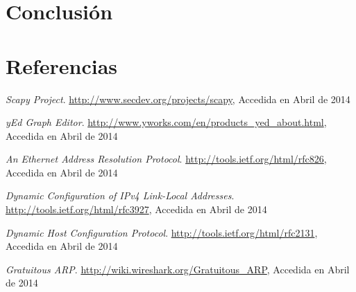 \documentclass[a4paper, 10pt, twoside]{article}
\begin{document}


\section{Conclusión}







\section{Referencias}


\begin{thebibliography}{9}

	\emph{Scapy Project}.
	\url{http://www.secdev.org/projects/scapy}, 
	Accedida en Abril de 2014

	\emph{yEd Graph Editor}.
	\url{http://www.yworks.com/en/products_yed_about.html}, 
	Accedida en Abril de 2014

	\emph{An Ethernet Address Resolution Protocol}.
	\url{http://tools.ietf.org/html/rfc826}, 
	Accedida en Abril de 2014
	
	\emph{Dynamic Configuration of IPv4 Link-Local Addresses}.
	\url{http://tools.ietf.org/html/rfc3927}, 
	Accedida en Abril de 2014
	
	\emph{Dynamic Host Configuration Protocol}.
	\url{http://tools.ietf.org/html/rfc2131}, 
	Accedida en Abril de 2014

	\emph{Gratuitous ARP}.
	\url{http://wiki.wireshark.org/Gratuitous_ARP}, 
	Accedida en Abril de 2014

\end{thebibliography}
\end{document}
